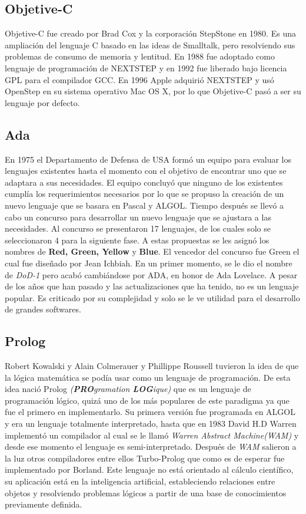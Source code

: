 \documentclass[twoside,twocolumn]{article}
\begin{document}
\subsection{Objetive-C}
Objetive-C fue creado por Brad Cox y la corporación StepStone en 1980. Es una ampliación del lenguaje C basado en las ideas de Smalltalk, pero resolviendo sus problemas de consumo de memoria y lentitud. En 1988 fue adoptado como lenguaje de programación de NEXTSTEP y en 1992 fue liberado bajo licencia GPL para el compilador GCC. En 1996 Apple adquirió NEXTSTEP y usó OpenStep en su sistema operativo Mac OS X, por lo que Objetive-C pasó a ser su lenguaje por defecto.

\subsection{Ada}

En 1975 el Departamento de Defensa de USA formó un equipo para evaluar los lenguajes existentes hasta el momento con el objetivo de encontrar uno que se adaptara a sus necesidades. El equipo concluyó que ninguno de los existentes cumplía los requerimientos necesarios por lo que se propuso la creación de un nuevo lenguaje que se basara en Pascal y ALGOL. Tiempo después se llevó a cabo un concurso para desarrollar un nuevo lenguaje que se ajustara a las necesidades. Al concurso se presentaron 17 lenguajes, de los cuales solo se seleccionaron 4 para la siguiente fase. A estas propuestas se les asignó los nombres de \textbf{Red, Green, Yellow} y \textbf{Blue}. El vencedor del concurso fue Green el cual fue diseñado por Jean Ichbiah. En un primer momento, se le dio el nombre de \textit{DoD-1} pero acabó cambiándose por ADA, en honor de Ada Lovelace. A pesar de los años que han pasado y las actualizaciones que ha tenido, no es un lenguaje popular. Es criticado por su complejidad y solo se le ve utilidad para el desarrollo de grandes softwares.

\subsection{Prolog}

Robert Kowalski y Alain Colmerauer y Phillippe Roussell tuvieron la idea de que la lógica matemática se podía usar como un lenguaje de programación. De esta idea nació Prolog \textit{(\textbf{PRO}gramation \textbf{LOG}ique)} que es un lenguaje de programación lógico, quizá uno de los más populares de este paradigma ya que fue el primero en implementarlo. Su primera versión fue programada en ALGOL y era un lenguaje totalmente interpretado, hasta que en 1983 David H.D Warren implementó un compilador al cual se le llamó \textit{Warren Abstract Machine(WAM)} y desde ese momento el lenguaje es semi-interpretado. Después de \textit{WAM} salieron a la luz otros compiladores entre ellos Turbo-Prolog que como es de esperar fue implementado por Borland. Este lenguaje no está orientado al cálculo científico, su aplicación está en la inteligencia artificial, estableciendo relaciones entre objetos y resolviendo problemas lógicos a partir de una base de conocimientos previamente definida.
\end{document}
